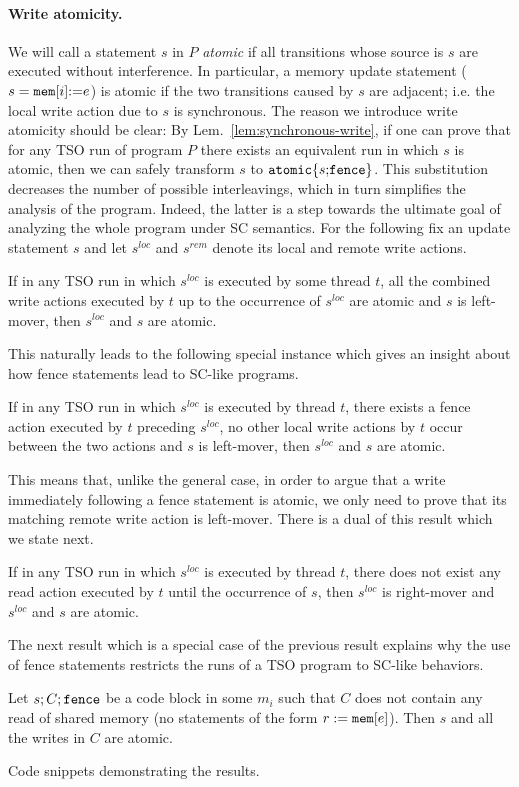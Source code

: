 \paragraph{Write atomicity.}
We will call a statement $s$ in $P$ {\em atomic} if all transitions whose source is $s$ are executed without interference. 
In particular, a memory update statement ($s=\mathtt{mem}[i]\mathtt{:=} e$) is atomic if the two transitions caused by $s$ are adjacent; i.e. the local write action due to $s$ is synchronous.
The reason we introduce write atomicity should be clear: By Lem.~\ref{lem:synchronous-write}, if one can prove that for any TSO run of program $P$ there exists an equivalent run in which $s$ is atomic, then we can safely transform $s$ to $\mathtt{atomic}\{s\mathtt{;} \mathtt{fence}\}$.
This substitution decreases the number of possible interleavings, which in turn simplifies the analysis of the program.
Indeed, the latter is a step towards the ultimate goal of analyzing the whole program under SC semantics.
For the following fix an update statement $s$ and let $s^{loc}$ and $s^{rem}$ denote its local and remote write actions.
\begin{lemma}
If in any TSO run in which $s^{loc}$ is executed by some thread $t$, all the combined write actions executed by $t$ up to the occurrence of $s^{loc}$ are atomic and $s$ is left-mover, then $s^{loc}$ and $s$ are atomic.
\end{lemma}
This naturally leads to the following special instance which gives an insight about how fence statements lead to SC-like programs.
\begin{corollary}
If in any TSO run in which $s^{loc}$ is executed by thread $t$, there exists a fence action executed by $t$ preceding $s^{loc}$, no other local write actions by $t$ occur between the two actions and $s$ is left-mover, then $s^{loc}$ and $s$ are atomic.
\end{corollary}
This means that, unlike the general case, in order to argue that a write immediately following a fence statement is atomic, we only need to prove that its matching remote write action is left-mover. 
There is a dual of this result which we state next.
\begin{lemma}
If in any TSO run in which $s^{loc}$ is executed by thread $t$, there does not exist any read action executed by $t$ until the occurrence of $s$, then $s^{loc}$ is right-mover and $s^{loc}$ and $s$ are atomic.
\end{lemma}
The next result which is a special case of the previous result explains why the use of fence statements restricts the runs of a TSO program to SC-like behaviors.
\begin{corollary}
Let $s;C;\mathtt{fence}$ be a code block in some $m_i$ such that $C$ does not contain any read of shared memory (no statements of the form $r:=\mathtt{mem}[e]$).
Then $s$ and all the writes in $C$ are atomic.
\end{corollary}


{\sc Code snippets demonstrating the results.}
